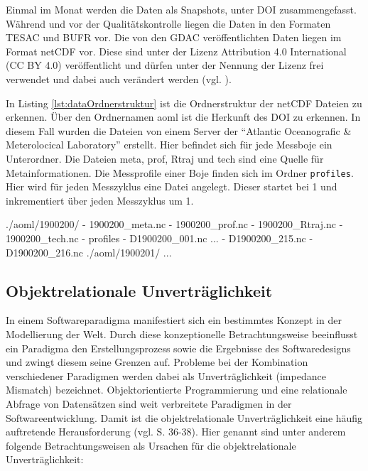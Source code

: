     Einmal im Monat werden die Daten als Snapshots, unter \gls{DOI} zusammengefasst.
    Während und vor der Qualitätskontrolle liegen die Daten in den Formaten \gls{TESAC} und \gls{BUFR} vor.
    Die von den \gls{GDAC} veröffentlichten Daten liegen im Format \gls{netCDF} vor. Diese sind unter der Lizenz Attribution 4.0 International (CC BY 4.0) veröffentlicht und dürfen unter der Nennung der Lizenz frei verwendet und dabei auch verändert werden (vgl. \cite{ArgoDataDocumentation}).



In Listing \ref{lst:dataOrdnerstruktur} ist die Ordnerstruktur der \gls{netCDF} Dateien zu erkennen. Über den Ordnernamen aoml ist die Herkunft des \gls{DOI} zu erkennen. In diesem Fall wurden die Dateien von einem Server der  "`Atlantic Oceanografic \& Meterolocical Laboratory"' erstellt. Hier befindet sich für jede Messboje ein Unterordner.  Die Dateien meta, prof, Rtraj und tech sind eine Quelle für Metainformationen. Die Messprofile einer Boje finden sich im Ordner \texttt{profiles}. Hier wird für jeden Messzyklus eine Datei angelegt. Dieser startet bei 1 und inkrementiert über jeden Messzyklus um 1.

    \begin{python}[label={lst:dataOrdnerstruktur}, caption={Die Verzeichnisstruktur der vom aoml bereitgestellten Daten}]
./aoml/1900200/
- 1900200_meta.nc
- 1900200_prof.nc
- 1900200_Rtraj.nc
- 1900200_tech.nc
- profiles
    - D1900200_001.nc
    ...
    - D1900200_215.nc
    - D1900200_216.nc
./aoml/1900201/
...\end{python}


\subsection{Objektrelationale Unverträglichkeit}

In einem Softwareparadigma manifestiert sich ein bestimmtes Konzept in der Modellierung der Welt. Durch diese konzeptionelle Betrachtungsweise beeinflusst ein Paradigma den Erstellungsprozess sowie die Ergebnisse des Softwaredesigns und zwingt diesem seine Grenzen auf. Probleme bei der Kombination verschiedener Paradigmen werden dabei als Unverträglichkeit (impedance Mismatch) bezeichnet.
Objektorientierte Programmierung  und eine relationale Abfrage von Datensätzen sind weit verbreitete Paradigmen in der Softwareentwicklung. Damit ist die objektrelationale Unverträglichkeit eine häufig auftretende Herausforderung (vgl. \cite{ireland2009classification} S. 36-38).
Hier genannt sind unter anderem folgende Betrachtungsweisen als Ursachen für die objektrelationale Unverträglichkeit:

